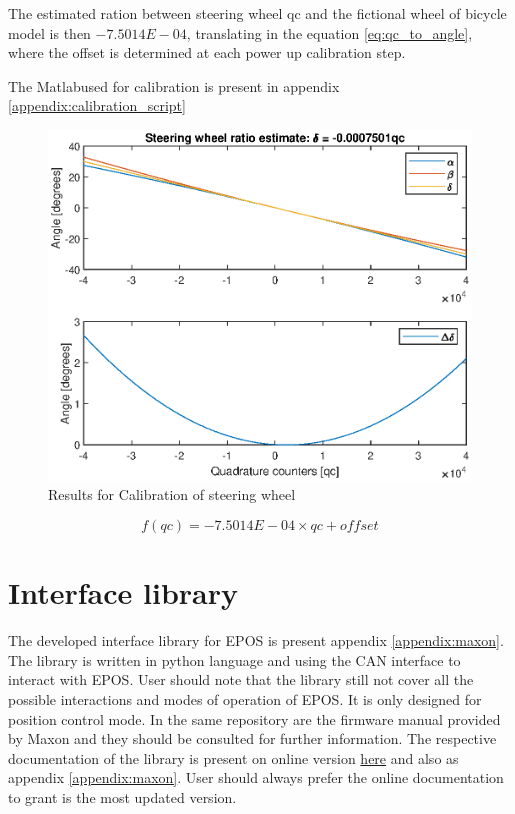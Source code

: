 The estimated ration between steering wheel \gls{qc} and the fictional wheel of bicycle model is then $-7.5014E-04$, translating in the equation \eqref{eq:qc_to_angle}, where the offset is determined at each power up calibration step. 

The Matlab\texttrademark used for calibration is present in appendix \ref{appendix:calibration_script}

\begin{figure}[!hb]
	\centering
	\includegraphics[width=0.7\linewidth]{figures/Steering_calibration_results.eps}
	\caption{Results for Calibration of steering wheel}
	\label{fig:calibration_results}
\end{figure}

\begin{equation}
f(qc) = -7.5014E-04 \times qc + offset
\label{eq:qc_to_angle}
\end{equation}


\section{Interface library}

The developed interface library for \gls{EPOS} is present appendix \ref{appendix:maxon}. The library is written in python language and using the CAN interface to interact with \gls{EPOS}. User should note that the library still not cover all the possible interactions and modes of operation of \gls{EPOS}. It is only designed for position control mode. In the same repository are the firmware manual provided by Maxon and they should be consulted for further information. The respective documentation of the library is present on online version \href{https://maxon-epos-canopen.readthedocs.io/en/latest/}{here} and also as appendix \ref{appendix:maxon}. User should always prefer the online documentation to grant is the most updated version.


